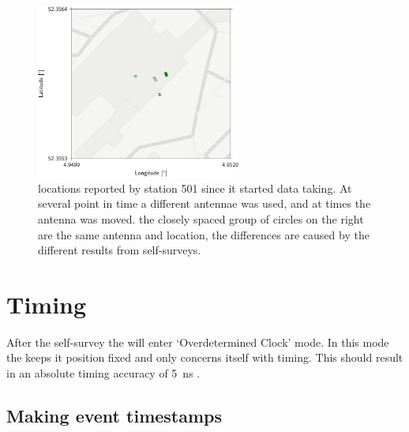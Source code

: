 \begin{figure}
    \centering
    \includegraphics[width=0.6\textwidth]
                    {plots/cluster/4d_station_501_gps}
    \caption{\gps locations reported by station 501 since it started data taking. At several point in time a different \gps antennae was used, and at times the antenna was moved. the closely spaced group of circles on the right are the same \gps antenna and location, the differences are caused by the different results from self-surveys.}
    \label{fig:4d_station_501_gps}
\end{figure}

%


\section{Timing}

After the self-survey the \gps will enter `Overdetermined Clock' mode. In this mode the \gps keeps it position fixed and only concerns itself with timing. This should result in an absolute timing accuracy of \SI{5}{\ns} \cite{trimble2007resolutiont}.


\subsection{Making event timestamps}
\label{sub:gps_timestamps}

